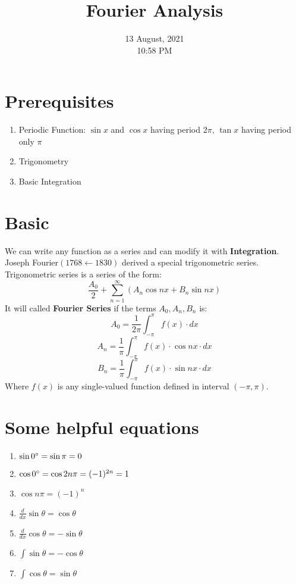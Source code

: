 \documentclass[11 pt]{article}
\title{Fourier Analysis}
\date{13 August, 2021 \\ 10:58 PM}
\begin{document}
\maketitle

\section*{Prerequisites}
\begin{enumerate}
	\item Periodic Function: $\sin x$ and $\cos x$ having period $2\pi$, $\tan x$ having period only $\pi$
	\item Trigonometry
	\item Basic Integration
\end{enumerate}

\section*{Basic}
We can write any function as a series and can modify it with \textbf{Integration}. Joseph Fourier$(1768 \leftarrow 1830)$ derived a special trigonometric series.
Trigonometric series is a series of the form:
$$\frac{A_0}{2} + \sum_{n=1}^{\infty} (A_n\cos nx + B_n\sin nx)$$
It will called \textbf{Fourier Series} if the terms $A_0, A_n, B_n$ is:
$$A_0 = \frac{1}{2\pi}\int_{-\pi}^{\pi} f(x)\cdot dx$$
$$A_n = \frac{1}{\pi}\int_{-\pi}^{\pi} f(x)\cdot \cos nx\cdot dx$$
$$B_n = \frac{1}{\pi}\int_{-\pi}^{\pi} f(x)\cdot \sin nx\cdot dx$$
Where \textbf{$f(x)$} is any single-valued function defined in interval $(-\pi, \pi)$.

\section*{Some helpful equations}
\begin{enumerate}
	\item $\sin 0\degree = \sin \pi = 0$
	\item $\cos 0\degree = \cos 2n\pi = (-1)^{2n} = 1$
	\item $\cos n\pi = (-1)^n$
	\item $\frac{d}{dx} \sin\theta = \cos\theta$
	\item $\frac{d}{dx} \cos\theta = -\sin\theta$
	\item $\int \sin\theta = -\cos\theta$
	\item $\int \cos\theta = \sin\theta$
\end{enumerate}
\end{document}
